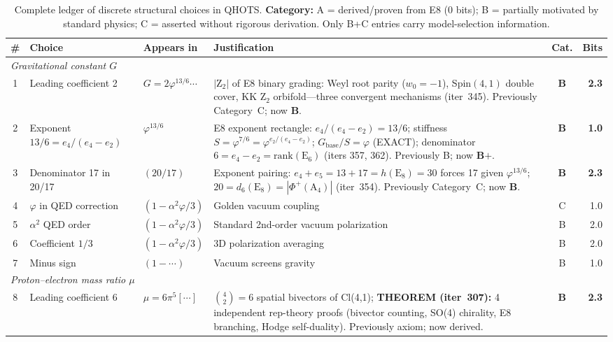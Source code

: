 \documentclass[aps,prd,twocolumn,superscriptaddress,floatfix,nofootinbib]{revtex4-2}
\theoremstyle{definition}
\theoremstyle{remark}
\newcommand{\vp}{\varphi}
\begin{document}
\begin{table}[t]
\centering
\caption{Complete ledger of discrete structural choices in QHOTS.
\textbf{Category:} A = derived/proven from E8 (0 bits);
B = partially motivated by standard physics;
C = asserted without rigorous derivation.
Only B+C entries carry model-selection information.}
\label{tab:complexity}
\begin{tabular}{clllcr}
\toprule
\# & Choice & Appears in & Justification & Cat. & Bits \\
\midrule
\multicolumn{6}{l}{\textit{Gravitational constant $G$}} \\
1  & Leading coefficient 2           & $G = 2\vp^{13/6}\cdots$   & $|\mathrm{Z}_2|$ of E8 binary grading: Weyl root parity ($w_0=-1$), Spin$(4,1)$ double cover, KK $\mathrm{Z}_2$ orbifold---three convergent mechanisms (iter~345). Previously Category~C; now \textbf{B}. & \textbf{B} & \textbf{2.3} \\
2  & Exponent $13/6 = e_4/(e_4-e_2)$ & $\vp^{13/6}$              & E8 exponent rectangle: $e_4/(e_4-e_2)=13/6$; stiffness $S=\vp^{7/6}=\vp^{e_2/(e_4-e_2)}$; $G_{\mathrm{base}}/S=\vp$ (EXACT); denominator $6=e_4-e_2=\mathrm{rank}(\mathrm{E}_6)$ (iters 357, 362). Previously B; now \textbf{B$+$}. & \textbf{B} & \textbf{1.0} \\
3  & Denominator 17 in 20/17         & $(20/17)$                 & Exponent pairing: $e_4+e_5=13+17=h(\mathrm{E}_8)=30$ forces 17 given $\vp^{13/6}$; $20=d_6(\mathrm{E}_8)=|\Phi^+(\mathrm{A}_4)|$ (iter~354). Previously Category~C; now \textbf{B}. & \textbf{B} & \textbf{2.3} \\
4  & $\vp$ in QED correction         & $(1-\alpha^2\vp/3)$       & Golden vacuum coupling                  & C & 1.0 \\
5  & $\alpha^2$ QED order            & $(1-\alpha^2\vp/3)$       & Standard 2nd-order vacuum polarization  & B & 2.0 \\
6  & Coefficient $1/3$               & $(1-\alpha^2\vp/3)$       & 3D polarization averaging               & B & 2.0 \\
7  & Minus sign                      & $(1-\cdots)$              & Vacuum screens gravity                  & B & 1.0 \\
\midrule
\multicolumn{6}{l}{\textit{Proton--electron mass ratio $\mu$}} \\
8  & Leading coefficient 6           & $\mu = 6\pi^5[\cdots]$    & $\binom{4}{2}=6$ spatial bivectors of Cl(4,1); \textbf{THEOREM (iter~307):} 4 independent rep-theory proofs (bivector counting, SO(4) chirality, E8 branching, Hodge self-duality). Previously axiom; now derived. & \textbf{B} & \textbf{2.3} \\

\end{tabular}
\end{table}
\end{document}
